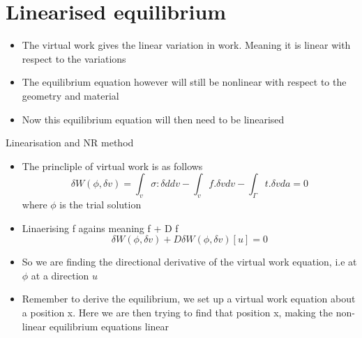 \section{Linearised equilibrium}


	\begin{frame}
		\begin{itemize}
			\item The virtual work gives the linear variation in work. Meaning it is linear with respect to the variations
			\item The equilibrium equation however will still be nonlinear with respect to the geometry and material
			\item Now this equilibrium equation will then need to be linearised
			
		\end{itemize}
	\end{frame}


	\begin{frame}{Linearisation and NR method}
		\begin{itemize}
			\item The princliple of virtual work is as follows 
			\begin{equation}
				\delta W(\phi,\delta v) = \int_v \sigma : \delta d dv - \int_v f.\delta v dv - \int_{\Gamma} t.\delta v da = 0
			\end{equation}
			where $\phi$ is the trial solution
			\item Linaerising f agains meaning f + D f
			\begin{equation}
			\delta W(\phi,\delta v) + D\delta W(\phi,\delta v)[u] = 0
			\end{equation}
			\item So we are finding the directional derivative of the virtual work equation, i.e at $\phi$ at a direction $u$
			\item Remember to derive the equilibrium, we set up a virtual work equation about a position x. Here we are then trying to find that position x, making the non-linear equilibrium equations linear
		\end{itemize}
	\end{frame}

